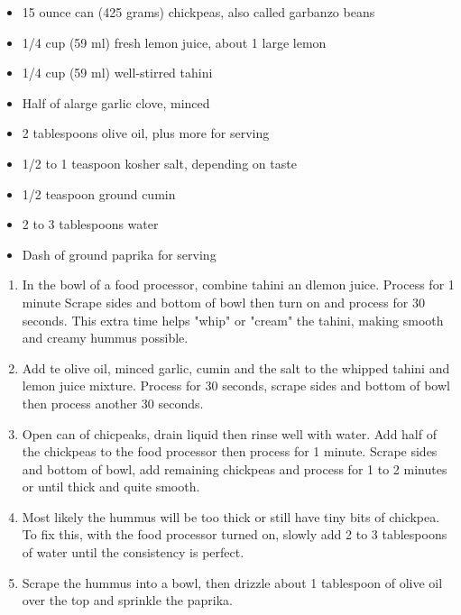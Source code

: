 \documentclass{article}
\begin{document}
\begin{framed}
    \begin{itemize}
        \item 15 ounce can (425 grams) chickpeas, also called garbanzo beans
        \item 1/4 cup (59 ml) fresh lemon juice, about 1 large lemon
        \item 1/4 cup (59 ml) well-stirred tahini
        \item Half of alarge garlic clove, minced
        \item 2 tablespoons olive oil, plus more for serving
        \item 1/2 to 1 teaspoon kosher salt, depending on taste
        \item 1/2 teaspoon ground cumin
        \item 2 to 3 tablespoons water
        \item Dash of ground paprika for serving
    \end{itemize}
\end{framed}

\begin{enumerate}
    \item 
        In the bowl of a food processor, combine tahini an dlemon juice. Process for 1 minute Scrape sides and bottom of bowl then turn on and process for 30 seconds. This extra time helps "whip" or "cream" the tahini, making smooth and creamy hummus possible.
    \item 
        Add te olive oil, minced garlic, cumin and the salt to the whipped tahini and lemon juice mixture. Process for 30 seconds, scrape sides and bottom of bowl then process another 30 seconds.
    \item 
        Open can of chicpeaks, drain liquid then rinse well with water. Add half of the chickpeas to the food processor then process for 1 minute. Scrape sides and bottom of bowl, add remaining chickpeas and process for 1 to 2 minutes or until thick and quite smooth.
    \item 
        Most likely the hummus will be too thick or still have tiny bits of chickpea. To fix this, with the food processor turned on, slowly add 2 to 3 tablespoons of water until the consistency is perfect.
    \item 
        Scrape the hummus into a bowl, then drizzle about 1 tablespoon of olive oil over the top and sprinkle the paprika.
\end{enumerate}
\end{document}
